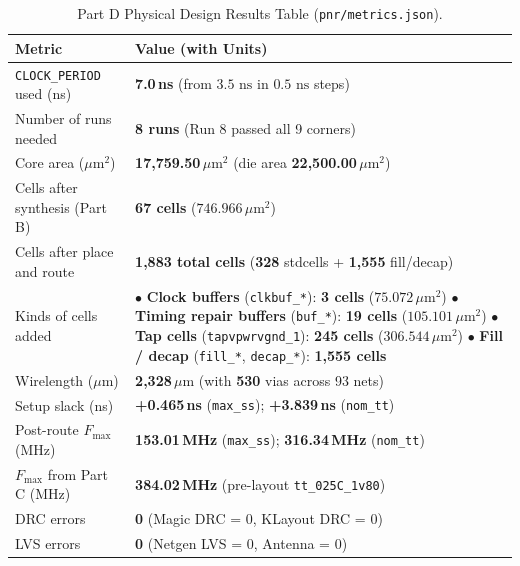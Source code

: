 \documentclass[conference,10pt]{IEEEtran}
\begin{document}
\begin{table}[!t]
    \centering
    \caption{Part D Physical Design Results Table (\texttt{pnr/metrics.json}).}
    \label{tab:partD_results}
    \footnotesize
    \begin{tabularx}{\columnwidth}{@{}l X@{}}
        \toprule
        \textbf{Metric} & \textbf{Value (with Units)} \\
        \midrule
        \texttt{CLOCK\_PERIOD} used (ns) & \textbf{7.0\,ns} (from $3.5\text{ ns}$ in $0.5\text{ ns}$ steps) \\
        Number of runs needed & \textbf{8 runs} (Run 8 passed all 9 corners) \\
        Core area ($\mu\text{m}^2$) & \textbf{17,759.50\,$\mu\text{m}^2$} (die area \textbf{22,500.00\,$\mu\text{m}^2$}) \\
        Cells after synthesis (Part B) & \textbf{67 cells} ($746.966\,\mu\text{m}^2$) \\
        Cells after place and route & \textbf{1,883 total cells} (\textbf{328} stdcells + \textbf{1,555} fill/decap) \\
        Kinds of cells added & $\bullet$ \textbf{Clock buffers} (\texttt{clkbuf\_*}): \textbf{3 cells} ($75.072\,\mu\text{m}^2$)\newline
        $\bullet$ \textbf{Timing repair buffers} (\texttt{buf\_*}): \textbf{19 cells} ($105.101\,\mu\text{m}^2$)\newline
        $\bullet$ \textbf{Tap cells} (\texttt{tapvpwrvgnd\_1}): \textbf{245 cells} ($306.544\,\mu\text{m}^2$)\newline
        $\bullet$ \textbf{Fill / decap} (\texttt{fill\_*}, \texttt{decap\_*}): \textbf{1,555 cells} \\
        Wirelength ($\mu\text{m}$) & \textbf{2,328\,$\mu\text{m}$} (with \textbf{530} vias across 93 nets) \\
        Setup slack (ns) & \textbf{+0.465\,ns} (\texttt{max\_ss}); \textbf{+3.839\,ns} (\texttt{nom\_tt}) \\
        Post-route $F_{\max}$ (MHz) & \textbf{153.01\,MHz} (\texttt{max\_ss}); \textbf{316.34\,MHz} (\texttt{nom\_tt}) \\
        $F_{\max}$ from Part C (MHz) & \textbf{384.02\,MHz} (pre-layout \texttt{tt\_025C\_1v80}) \\
        DRC errors & \textbf{0} (Magic DRC = 0, KLayout DRC = 0) \\
        LVS errors & \textbf{0} (Netgen LVS = 0, Antenna = 0) \\
        \bottomrule
    \end{tabularx}
\end{table}
\end{document}
